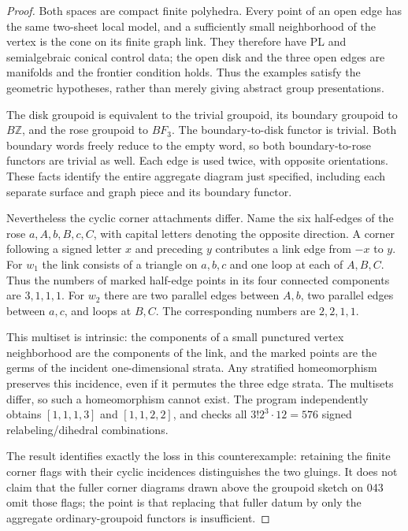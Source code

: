 \begin{proof}
Both spaces are compact finite polyhedra. Every point of an open
edge has the same two-sheet local model, and a sufficiently small
neighborhood of the vertex is the cone on its finite graph link.
They therefore have PL and semialgebraic conical control data;
the open disk and the three open edges are manifolds and the
frontier condition holds. Thus the examples satisfy the geometric
hypotheses, rather than merely giving abstract group presentations.

The disk groupoid is equivalent to the trivial groupoid, its
boundary groupoid to $B\mathbb Z$, and the rose groupoid to
$BF_3$. The boundary-to-disk functor is trivial. Both boundary
words freely reduce to the empty word, so both boundary-to-rose
functors are trivial as well. Each edge is used twice, with
opposite orientations. These facts identify the entire aggregate
diagram just specified, including each separate surface and graph
piece and its boundary functor.

Nevertheless the cyclic corner attachments differ. Name the six
half-edges of the rose $a,A,b,B,c,C$, with capital letters denoting
the opposite direction. A corner following a signed letter $x$
and preceding $y$ contributes a link edge from $-x$ to $y$.
For $w_1$ the link consists of a triangle on $a,b,c$ and one loop
at each of $A,B,C$. Thus the numbers of marked half-edge points
in its four connected components are $3,1,1,1$.
For $w_2$ there are two parallel edges between $A,b$, two
parallel edges between $a,c$, and loops at $B,C$. The corresponding
numbers are $2,2,1,1$.

This multiset is intrinsic: the components of a small punctured
vertex neighborhood are the components of the link, and the
marked points are the germs of the incident one-dimensional
strata. Any stratified homeomorphism preserves this incidence,
even if it permutes the three edge strata. The multisets differ,
so such a homeomorphism cannot exist. The program independently
obtains $[1,1,1,3]$ and $[1,1,2,2]$, and checks all
$3!2^3\cdot12=576$ signed relabeling/dihedral combinations.

The result identifies exactly the loss in this counterexample:
retaining the finite corner flags with their cyclic incidences
distinguishes the two gluings. It does not claim that the fuller
corner diagrams drawn above the groupoid sketch on 043 omit
those flags; the point is that replacing that fuller datum by
only the aggregate ordinary-groupoid functors is insufficient.
\end{proof}

